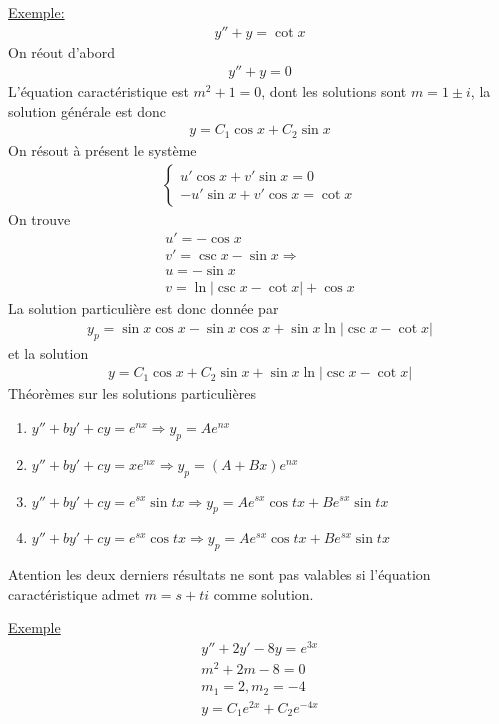 \underline{Exemple:}
\begin{eqnarray}
	y''+y=\cot x
\end{eqnarray}
On réout d'abord
\begin{eqnarray*}
	y''+y=0
\end{eqnarray*}
L'équation caractéristique est $m^2+1=0$, dont les solutions sont $m=1\pm i$, la solution générale est donc
\begin{eqnarray*}
	y=C_1\cos{x}+C_2\sin{x}
\end{eqnarray*}
On résout à présent le système
\begin{eqnarray*}
	\begin{cases}
		u'\cos x+v'\sin{x}=0\\
		-u'\sin{x}+v'\cos{x}=\cot x
	\end{cases}
\end{eqnarray*}
On trouve \begin{eqnarray*}
	u'=-\cos x\\
	v'=\csc x-\sin x
	\Rightarrow\\
	u=-\sin x\\
	v=\ln{|\csc{x}-\cot{x}|}+\cos{x}
\end{eqnarray*}
La solution particulière est donc donnée par
\begin{eqnarray*}
	y_p=\sin x\cos x-\sin x\cos x+\sin x\ln{|\csc{x}-\cot{x}|}
\end{eqnarray*}
et la solution 
\begin{eqnarray*}
	y=C_1\cos x+C_2\sin x+\sin x\ln{|\csc{x}-\cot{x}|}
\end{eqnarray*}
Théorèmes sur les solutions particulières
\begin{enumerate}
	\item $y''+by'+cy=e^{nx} \Rightarrow y_p=Ae^{nx}$
	\item $y''+by'+cy=xe^{nx} \Rightarrow y_p=(A+Bx)e^{nx}$
	\item $y''+by'+cy=e^{sx}\sin{tx} \Rightarrow y_p=Ae^{sx}\cos{tx}+Be^{sx}\sin{tx}$
	\item $y''+by'+cy=e^{sx}\cos{tx} \Rightarrow y_p=Ae^{sx}\cos{tx}+Be^{sx}\sin{tx}$
\end{enumerate}
Atention les deux derniers résultats ne sont pas valables si l'équation caractéristique admet $m=s+ti$ comme solution.


\underline{Exemple}
\begin{eqnarray*}
	y''+2y'-8y=e^{3x}\\
	m^2+2m-8=0\\
	m_1=2, m_2=-4\\
	y=C_1e^{2x}+C_2e^{-4x}
\end{eqnarray*}

